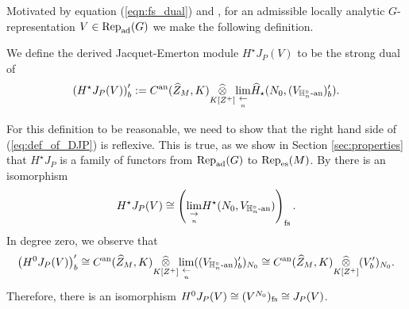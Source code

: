 \documentclass[10pt]{amsart}
\begin{document}
Motivated by equation (\ref{eqn:fs_dual}) and \cite[Lem. 3.2.19]{Jacquet1}, for an admissible locally analytic $G$-representation $V\in\textnormal{Rep}_{\textnormal{ad}}(G)$ we make the following definition. 
\begin{definition}
We define the derived Jacquet-Emerton module $H^{\star}J_{P}(V)$ to be the strong dual of \begin{equation}\label{eq:def_of_DJP}
    \left(H^{\star}J_{P}(V)\right)^{\prime}_{b} := C^{\textnormal{an}}(\widehat{Z}_{M},K)\underset{K[Z^{+}]}{\widehat{\otimes}} \underset{\underset{n}{\leftarrow}}{\lim}\widehat{H}_{\star}(N_{0},(V_{\mathbb{H}_{n}^{\circ}\textnormal{-an}})^{\prime}_{b}). 
\end{equation}
\end{definition} 

For this definition to be reasonable, we need to show that the right hand side of (\ref{eq:def_of_DJP}) is reflexive. This is true, as we show in Section \ref{sec:properties} that $H^{\star}J_P$ is a family of functors from $\textnormal{Rep}_{\textnormal{ad}}(G)$ to $\textnormal{Rep}_{\textnormal{es}}(M)$. By \cite[Prop. 1.1.32]{analytic} there is an isomorphism \begin{equation*}
    H^{\star}J_{P}(V) \cong \left(\underset{\underset{n}{\rightarrow}}{\lim}H^{\star}(N_{0},V_{\mathbb{H}_{n}^{\circ}\textnormal{-an}}) \right)_{\textnormal{fs}}.
\end{equation*} In degree zero, we observe that \begin{equation*}
    \left(H^{0}J_{P}(V)\right)^{\prime}_{b} \cong C^{\textnormal{an}}(\widehat{Z}_{M},K)\underset{K[Z^{+}]}{\widehat{\otimes}} \underset{\underset{n}{\leftarrow}}{\lim}((V_{\mathbb{H}_{n}^{\circ}\textnormal{-an}})^{\prime}_{b})_{N_{0}} \cong C^{\textnormal{an}}(\widehat{Z}_{M},K)\underset{K[Z^{+}]}{\widehat{\otimes}} (V^{\prime}_{b})_{N_{0}}.
\end{equation*} Therefore, there is an isomorphism $H^{0}J_{P}(V)\cong (V^{N_{0}})_{\textnormal{fs}} \cong J_{P}(V)$. 
\end{document}
